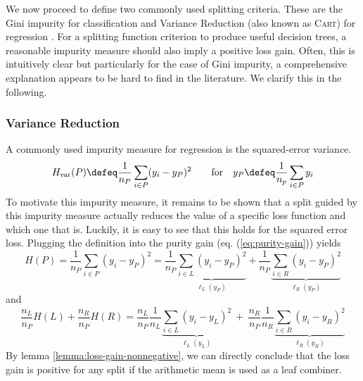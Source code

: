 \documentclass[../main.tex]{subfiles}
\begin{document}
We now proceed to define two commonly used splitting criteria. These are the Gini impurity for classification and Variance Reduction (also known as \textsc{Cart}) for regression \cite{tibshirani_ElementsStatisticalLearning_2017}.
For a splitting function criterion to produce useful decision trees, a reasonable impurity measure should also imply a positive loss gain. Often, this is intuitively clear but particularly for the case of Gini impurity, a comprehensive explanation appears to be hard to find in the literature. We clarify this in the following.

\subsubsection{Variance Reduction}

A commonly used impurity measure for regression is the squared-error variance. 
$$
H_{\text{var}}(P) \defeq \frac{1}{n_{P}} \sum_{i \in P} (y_{i} - y_{P})^2 \hspace{2em} \text{for} \hspace{1em} y_{P} \defeq \frac{1}{n_{p}}\sum_{i\in P}y_{i}
$$
To motivate this impurity measure, it remains to be shown that a split guided by this impurity measure actually reduces the value of a specific loss function and which one that is. Luckily, it is easy to see that this holds for the squared error loss. Plugging the definition into the purity gain (eq. (\ref{eq:purity-gain})) yields
$$
H(P) = \frac{1}{n_{P}} \sum_{i \in P} (y_{i} - y_{P})^2
= \frac{1}{n_{P}}  
\underbrace{
 \sum_{i \in L} (y_{i} - y_P)^2 
 }_{\ell_{L}(y_{P})}
 +
\frac{1}{n_{P}}
 \underbrace{
 \sum_{i \in R} (y_{i} - y_{P}) ^2
 }_{\ell_{R}(y_{P})}
$$
and
$$
\frac{n_{L}}{n_{P}} H(L) +
\frac{n_{R}}{n_{P}} H(R) = 
\frac{n_{L}}{n_{P}} \frac{1}{n_{L}} 
\underbrace{
\sum_{i \in L} (y_{i} - y_{L})^2
}_{\ell_{L}(y_{L})}
~ + ~ 
\frac{n_{R}}{n_{P}} \frac{1}{n_{R}}
\underbrace{
 \sum_{i \in R} (y_{i} - y_{R})^2
}_{\ell_{R}(y_{R})}
$$
By lemma \ref{lemma:loss-gain-nonnegative}, we can directly conclude that the loss gain is positive for any split if the arithmetic mean is used as a leaf combiner.
\end{document}
